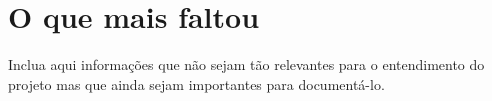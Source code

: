 \chapter{O que mais faltou}

Inclua aqui informações que não sejam tão relevantes para o entendimento do projeto mas que ainda sejam importantes para documentá-lo. 

